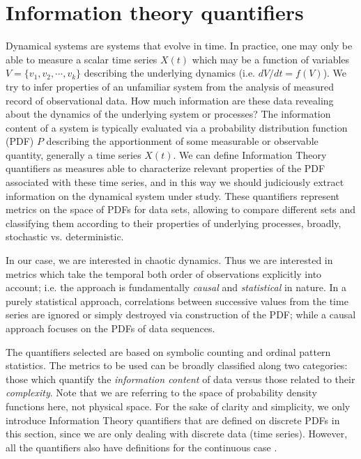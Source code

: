 \section{Information theory quantifiers}\label{sec:quanti}

Dynamical systems are systems that evolve in time.
In practice, one may only be able to measure a scalar time series $X(t)$ which may be a function of variables $V=\{ v_1, v_2,\cdots, v_k\}$ describing the underlying dynamics (i.e. $dV/dt=f(V)$).
We try to infer properties of an unfamiliar system from the analysis of measured record of observational data. 
How much information are these data revealing about the dynamics of the underlying system or processes?
The information content of a system is typically evaluated via a probability distribution function (PDF) $P$ describing the apportionment of some measurable or observable quantity, generally a time series $X(t)$. 
We can define Information Theory quantifiers as measures able to characterize relevant properties of the PDF associated with these time series, and in this way we should judiciously extract information on the dynamical system under study.
These quantifiers represent metrics on the space of PDFs for data sets, allowing to compare different sets and classifying them according to their properties of underlying processes, broadly, stochastic vs. deterministic.

In our case, we are interested in chaotic dynamics.
Thus we are interested in metrics which take the temporal both order of observations explicitly into account; i.e. the approach is fundamentally \textit{causal} and \textit{statistical} in nature.
In a purely statistical approach, correlations between successive values from the time series are ignored or simply destroyed via construction of the PDF; while a causal approach focuses on the PDFs of data sequences.

The quantifiers selected are based on symbolic counting and ordinal pattern statistics.
The metrics to be used can be broadly classified along two categories: those which quantify the \textit{information content} of data versus those related to their \textit{complexity}.
Note that we are referring to the space of probability density functions here, not physical space.
For the sake of clarity and simplicity, we only introduce Information Theory quantifiers that are defined on discrete PDFs in this section, since we are only dealing with discrete data (time series).
However, all the quantifiers also have definitions for the continuous case \cite{Shannon1948,Frieden2004} . 

